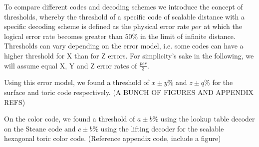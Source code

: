 To compare different codes and decoding schemes
we introduce the concept of thresholds, whereby the threshold
of a specific code of scalable distance with a specific decoding 
scheme is defined as the physical error rate $per$ at which the logical
error rate becomes greater than $50\%$ in the limit of infinite 
distance. \\
Thresholds can vary depending on the error model, i.e. 
some codes can have a higher threshold for X than for Z errors.
For simplicity's sake in the following, we will assume equal 
X, Y and Z error rates of $\frac{per}{3}$.

Using this error model, we found a threshold of $x\pm y \%$ and
$z\pm q\%$ for the surface and toric code respectively. 
(A BUNCH OF FIGURES AND APPENDIX REFS)

On the color code, we found a threshold of $a\pm b\%$ using the 
lookup table decoder on the Steane code and $c\pm b\%$ using the 
lifting decoder for the scalable hexagonal toric color code. 
(Reference appendix code, include a figure)